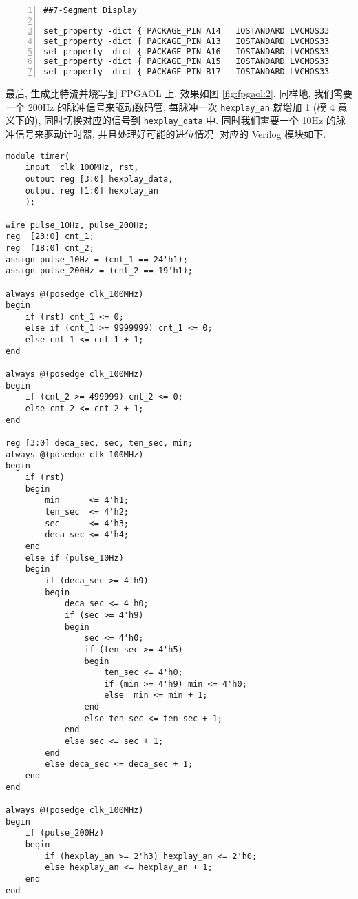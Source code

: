 \documentclass[UTF8,fontset=fandol]{ctexart}
\begin{document}
\begin{ExQuestions}
\begin{lstlisting}[basicstyle=\footnotesize\ttfamily, numbers = left, language = XML, frame=lrtb, frameround=tttt, caption={xdc 约束文件}]
##7-Segment Display

set_property -dict { PACKAGE_PIN A14   IOSTANDARD LVCMOS33     } [get_ports { d[0] }]; 
set_property -dict { PACKAGE_PIN A13   IOSTANDARD LVCMOS33     } [get_ports { d[1] }]; 
set_property -dict { PACKAGE_PIN A16   IOSTANDARD LVCMOS33     } [get_ports { d[2] }]; 
set_property -dict { PACKAGE_PIN A15   IOSTANDARD LVCMOS33     } [get_ports { d[3] }]; 
set_property -dict { PACKAGE_PIN B17   IOSTANDARD LVCMOS33     } [get_ports { an }]; 
  \end{lstlisting}
  最后, 生成比特流并烧写到 FPGAOL 上, 效果如图 \ref{fig:fpgaol:2}.
  \newpage
  \question 同样地, 我们需要一个 200Hz 的脉冲信号来驱动数码管, 每脉冲一次 \texttt{hexplay\_an} 就增加 1 (模 4 意义下的), 同时切换对应的信号到 \texttt{hexplay\_data} 中.
  同时我们需要一个 10Hz 的脉冲信号来驱动计时器, 并且处理好可能的进位情况. 对应的 Verilog 模块如下.
  \begin{lstlisting}[style=verilogstyle, caption={计时器模块}]
module timer(
    input  clk_100MHz, rst,
    output reg [3:0] hexplay_data,
    output reg [1:0] hexplay_an
    );
    
wire pulse_10Hz, pulse_200Hz;
reg  [23:0] cnt_1;
reg  [18:0] cnt_2;
assign pulse_10Hz = (cnt_1 == 24'h1);
assign pulse_200Hz = (cnt_2 == 19'h1);

always @(posedge clk_100MHz)
begin
    if (rst) cnt_1 <= 0;
    else if (cnt_1 >= 9999999) cnt_1 <= 0;
    else cnt_1 <= cnt_1 + 1;
end

always @(posedge clk_100MHz)
begin
    if (cnt_2 >= 499999) cnt_2 <= 0;
    else cnt_2 <= cnt_2 + 1;
end

reg [3:0] deca_sec, sec, ten_sec, min;
always @(posedge clk_100MHz)
begin
    if (rst)
    begin
        min      <= 4'h1;
        ten_sec  <= 4'h2;
        sec      <= 4'h3;
        deca_sec <= 4'h4;
    end
    else if (pulse_10Hz)
    begin
        if (deca_sec >= 4'h9)
        begin
            deca_sec <= 4'h0;
            if (sec >= 4'h9)
            begin
                sec <= 4'h0;
                if (ten_sec >= 4'h5)
                begin
                    ten_sec <= 4'h0;
                    if (min >= 4'h9) min <= 4'h0;
                    else  min <= min + 1;
                end
                else ten_sec <= ten_sec + 1;
            end
            else sec <= sec + 1;
        end
        else deca_sec <= deca_sec + 1;
    end
end

always @(posedge clk_100MHz)
begin
    if (pulse_200Hz)
    begin 
        if (hexplay_an >= 2'h3) hexplay_an <= 2'h0;
        else hexplay_an <= hexplay_an + 1;
    end
end


\end{lstlisting}
\end{ExQuestions}
\end{document}
